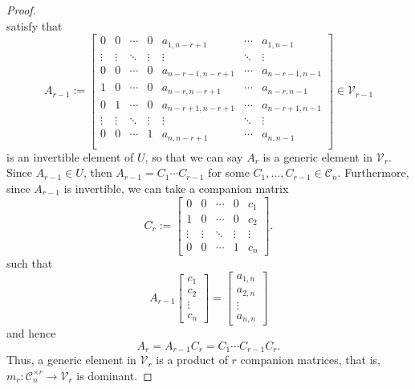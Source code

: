 \documentclass[reqno]{amsart}
\theoremstyle{definition}
\numberwithin{equation}{section}
\begin{document}
\begin{proof}
\begin{equation*}
    \end{equation*}
    satisfy that
    \begin{equation*}
        A_{r-1}:=\left[\begin{array}{cccc|ccc}
             0 & 0 &\cdots & 0 & a_{1,n-r+1} & \cdots & a_{1,n-1} \\
            \vdots & \vdots  & \ddots & \vdots & \vdots & \ddots & \vdots \\
            0 & 0  &\cdots & 0 & a_{n-r-1,n-r+1} & \cdots & a_{n-r-1,n-1} \\
            1 & 0  &\cdots & 0 & a_{n-r,n-r+1} & \cdots & a_{n-r,n-1} \\
            0  & 1 & \cdots & 0 & a_{n-r+1,n-r+1} & \cdots & a_{n-r+1,n-1}\\
            \vdots & \vdots & \ddots & \vdots & \vdots & \ddots & \vdots \\
             0 & 0 &  \cdots & 1 & a_{n,n-r+1} & \cdots & a_{n,n-1} \\
        \end{array}\right] \in \mathcal{V}_{r-1}
    \end{equation*}
    is an invertible element of $U$, so that we can say $A_r$ is a generic element in $\mathcal{V}_r$. Since $A_{r-1} \in U$, then $A_{r-1}=C_1\cdots C_{r-1}$ for some $C_1,...,C_{r-1} \in \mathcal{C}_n$. Furthermore, since $A_{r-1}$ is invertible, we can take a companion matrix 
    \begin{equation*}
        C_r:= \begin{bmatrix}
        0 & 0 & \cdots & 0 & c_1\\
        1 & 0 & \cdots & 0 & c_2\\
        \vdots & \vdots & \ddots & \vdots & \vdots \\
        0 & 0 & \cdots & 1 & c_n
    \end{bmatrix}.
    \end{equation*}
    such that
    \begin{equation*}
        A_{r-1}\begin{bmatrix}
            c_1 \\ c_2 \\ \vdots \\ c_n
        \end{bmatrix}=\begin{bmatrix}
            a_{1,n} \\ a_{2,n} \\ \vdots \\ a_{n,n}
        \end{bmatrix}
    \end{equation*} 
    and hence
    \begin{equation*}
        A_r=A_{r-1}C_r=C_1\cdots C_{r-1}C_r.
    \end{equation*}
    Thus, a generic element in $\mathcal{V}_r$ is a product of $r$ companion matrices, that is, $m_r:\mathcal{C}_n^{\times r} \rightarrow \mathcal{V}_r$ is dominant.
\end{proof}
\end{document}
